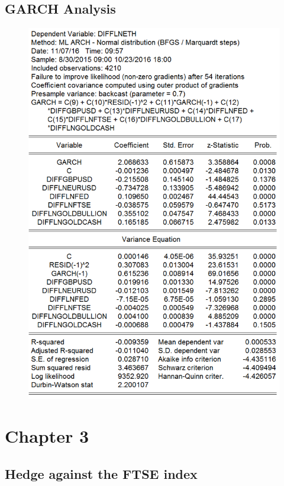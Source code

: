 \documentclass[11pt]{report}
\begin{document}
\subsection*{GARCH Analysis}
\begin{figure}[!h]
\centering
\includegraphics[scale=0.6]{Appendix/chap2/19}
\end{figure}
\clearpage
\section*{Chapter 3}
\subsection*{Hedge against the FTSE index}
\end{document}
